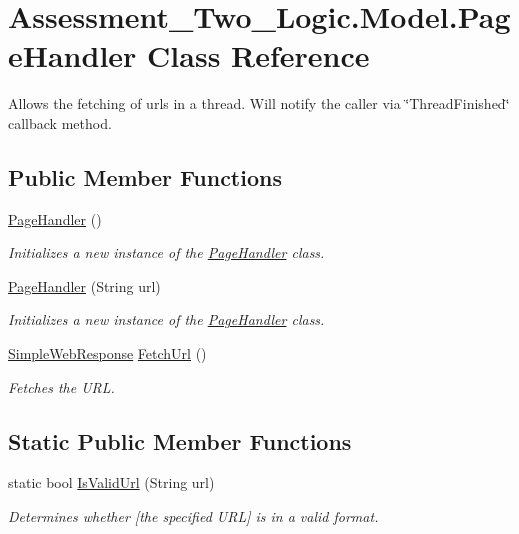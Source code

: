 \hypertarget{class_assessment___two___logic_1_1_model_1_1_page_handler}{
\section{Assessment\_\-Two\_\-Logic.Model.PageHandler Class Reference}
\label{class_assessment___two___logic_1_1_model_1_1_page_handler}
}


Allows the fetching of urls in a thread. Will notify the caller via \char`\"{}ThreadFinished\char`\"{} callback method.  


\subsection*{Public Member Functions}
\begin{DoxyCompactItemize}
\item 
\hyperlink{class_assessment___two___logic_1_1_model_1_1_page_handler_a7e12c7bb3c60b9ac95a8c182341336cc}{PageHandler} ()
\begin{DoxyCompactList}\small\item\em Initializes a new instance of the \hyperlink{class_assessment___two___logic_1_1_model_1_1_page_handler}{PageHandler} class. \item\end{DoxyCompactList}\item 
\hyperlink{class_assessment___two___logic_1_1_model_1_1_page_handler_ac74ee6474db99f546d2b2731e94ab3ca}{PageHandler} (String url)
\begin{DoxyCompactList}\small\item\em Initializes a new instance of the \hyperlink{class_assessment___two___logic_1_1_model_1_1_page_handler}{PageHandler} class. \item\end{DoxyCompactList}\item 
\hyperlink{class_assessment___two___logic_1_1_model_1_1_simple_web_response}{SimpleWebResponse} \hyperlink{class_assessment___two___logic_1_1_model_1_1_page_handler_a2ecc8f38e336b6c0969056230622990a}{FetchUrl} ()
\begin{DoxyCompactList}\small\item\em Fetches the URL. \item\end{DoxyCompactList}\end{DoxyCompactItemize}
\subsection*{Static Public Member Functions}
\begin{DoxyCompactItemize}
\item 
static bool \hyperlink{class_assessment___two___logic_1_1_model_1_1_page_handler_a1ae180eb20f29f8eff8d0528c50b4851}{IsValidUrl} (String url)
\begin{DoxyCompactList}\small\item\em Determines whether \mbox{[}the specified URL\mbox{]} is in a valid format. \item\end{DoxyCompactList}\end{DoxyCompactItemize}
